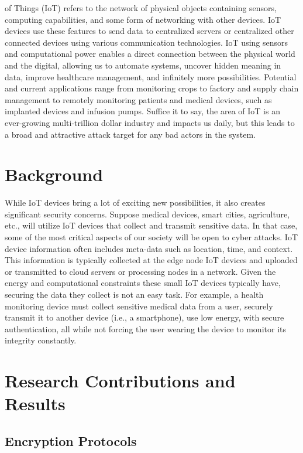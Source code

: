\documentclass[journal,onecolumn]{IEEEtran}
\begin{document}
 of Things (IoT) refers to the network of physical objects containing sensors, computing capabilities, and some form of networking with other devices. IoT devices use these features to send data to centralized servers or centralized other connected devices using various communication technologies. IoT using sensors and computational power enables a direct connection between the physical world and the digital, allowing us to automate systems, uncover hidden meaning in data, improve healthcare management, and infinitely more possibilities. Potential and current applications range from monitoring crops to factory and supply chain management to remotely monitoring patients and medical devices, such as implanted devices and infusion pumps. Suffice it to say, the area of IoT is an ever-growing multi-trillion dollar industry and impacts us daily, but this leads to a broad and attractive attack target for any bad actors in the system. 

\section{Background}

While IoT devices bring a lot of exciting new possibilities, it also creates significant security concerns. Suppose medical devices, smart cities, agriculture, etc., will utilize IoT devices that collect and transmit sensitive data. In that case, some of the most critical aspects of our society will be open to cyber attacks. IoT device information often includes meta-data such as location, time, and context. This information is typically collected at the edge node IoT devices and uploaded or transmitted to cloud servers or processing nodes in a network. Given the energy and computational constraints these small IoT devices typically have, securing the data they collect is not an easy task. For example, a health monitoring device must collect sensitive medical data from a user, securely transmit it to another device (i.e., a smartphone), use low energy, with secure authentication, all while not forcing the user wearing the device to monitor its integrity constantly. 

\section{Research Contributions and Results}

\subsection{Encryption Protocols}
\end{document}

